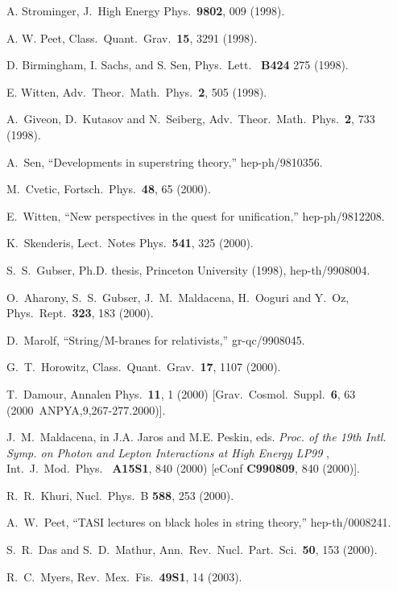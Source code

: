 \documentclass[12pt]{article} \usepackage{latexsym}
\begin{document}
\begin{thebibliography}{99}
 A. Strominger, J.\ High Energy Phys.\ {\bf 9802}, 009
  (1998).

 A. W. Peet, Class.\ Quant.\ Grav.\ {\bf 15}, 3291
  (1998).

 D. Birmingham, I. Sachs, and S. Sen, Phys.\ Lett.\ {\bf
  B424} 275 (1998).

 E. Witten, Adv.\ Theor.\ Math.\ Phys.\ {\bf 2}, 505
  (1998).
  
 A.~Giveon, D.~Kutasov and N.~Seiberg, Adv.\ Theor.\
  Math.\ Phys.\  {\bf 2}, 733 (1998).
  
 A.~Sen, ``Developments in superstring theory,''
  hep-ph/9810356.
  
 M.~Cvetic, Fortsch.\ Phys.\  {\bf 48}, 65 (2000).

 E.~Witten, ``New perspectives in the quest for
  unification,'' hep-ph/9812208.

 K.~Skenderis, Lect.\ Notes Phys.\  {\bf 541},
  325 (2000).
  
 S.~S.~Gubser, Ph.D. thesis, Princeton University
  (1998), hep-th/9908004.
  
 O.~Aharony, S.~S.~Gubser, J.~M.~Maldacena, H.~Ooguri
  and Y.~Oz, Phys.\ Rept.\  {\bf 323}, 183 (2000).
  
 D.~Marolf, ``String/M-branes for relativists,''
  gr-qc/9908045.
  
 G.~T.~Horowitz, Class.\ Quant.\ Grav.\  {\bf 17},
  1107 (2000).
  
 T.~Damour, Annalen Phys.\  {\bf 11}, 1 (2000)
  [Grav.\ Cosmol.\ Suppl.\  {\bf 6}, 63 (2000\ ANPYA,9,267-277.2000)].

 J.~M.~Maldacena, in J.A. Jaros and M.E. Peskin,
eds. {\it Proc. of the 19th Intl. Symp. on Photon and Lepton
Interactions at High Energy LP99 }, Int.\ J.\ Mod.\ Phys.\ {\bf
A15S1}, 840 (2000) [eConf {\bf C990809}, 840 (2000)].

 R.~R.~Khuri, Nucl.\ Phys.\ B {\bf 588}, 253 (2000).

 A.~W.~Peet, ``TASI lectures on black holes in string
  theory,'' hep-th/0008241.

 S.~R.~Das and S.~D.~Mathur, Ann.\ Rev.\ Nucl.\ Part.\
  Sci.\  {\bf 50}, 153 (2000).
  
 R.~C.~Myers, Rev.\ Mex.\ Fis.\  {\bf 49S1}, 14 (2003).


\end{thebibliography}
\end{document}
